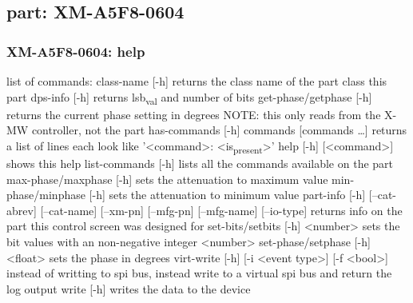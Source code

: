 \documentclass[11pt]{article}
\begin{document}
\subsection{part: XM-A5F8-0604}
\label{sec:orgb274049}
\subsubsection{XM-A5F8-0604: help}
\label{sec:orgb96f2b6}
list of commands:
  class-name [-h]
    returns the class name of the part class this part
  dps-info [-h]
    returns lsb\textsubscript{val} and number of bits
  get-phase/getphase [-h]
    returns the current phase setting in degrees
    NOTE: this only reads from the X-MW controller, not the part
  has-commands [-h] commands [commands \ldots{}]
    returns a list of lines each look like '<command>: <is\textsubscript{present}>'
  help [-h] [<command>]
    shows this help
  list-commands [-h]
    lists all the commands available on the part
  max-phase/maxphase [-h]
    sets the attenuation to maximum value
  min-phase/minphase [-h]
    sets the attenuation to minimum value
  part-info  [-h] [--cat-abrev] [--cat-name] [--xm-pn] [--mfg-pn] [--mfg-name]
          [--io-type]
    returns info on the part this control screen was designed for
  set-bits/setbits [-h] <number>
    sets the bit values with an non-negative integer <number>
  set-phase/setphase [-h] <float>
    sets the phase in degrees
  virt-write [-h] [-i <event type>] [-f <bool>]
    instead of writting to spi bus, instead write to a virtual spi bus
    and return the log output
  write [-h]
    writes the data to the device
\end{document}
